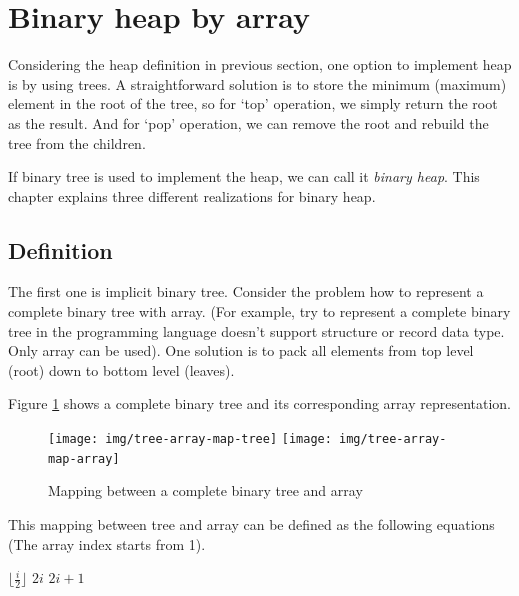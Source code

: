 \documentclass[b5paper]{article}
\begin{document}
\section{Binary heap by array}
\label{ibheap}  

Considering the heap definition in previous section, one option to
implement heap is by using trees. A straightforward solution is
to store the minimum (maximum) element in the root of the
tree, so for `top' operation, we simply return the root as the
result. And for `pop' operation, we can remove the root and
rebuild the tree from the children.

If binary tree is used to implement the heap, we
can call it {\em binary heap}. This chapter explains three different
realizations for binary heap.

\subsection{Definition}

The first one is implicit binary tree. Consider the problem
how to represent a complete binary tree with array. (For example, try to
represent a complete binary tree in the programming language doesn't support structure
or record data type. Only array can be used). One solution
is to pack all elements from top level (root) down to bottom level (leaves).

Figure \ref{fig:tree-array-map} shows a complete binary tree and
its corresponding array representation.

\begin{figure}[htbp]
       \begin{center}
       	  \texttt{[image: img/tree-array-map-tree]}
          \texttt{[image: img/tree-array-map-array]}
        \caption{Mapping between a complete binary tree and array} \label{fig:tree-array-map}
       \end{center}
\end{figure}

This mapping between tree and array can be defined as
the following equations (The array index starts from 1).

\begin{algorithmic}[1]
  \State \Return $\lfloor \frac{i}{2} \rfloor$
\EndFunction
\Statex
{}
  \State \Return $2i$
\EndFunction
\Statex
{}
  \State \Return $2i+1$
\EndFunction
\end{algorithmic}
\end{document}

